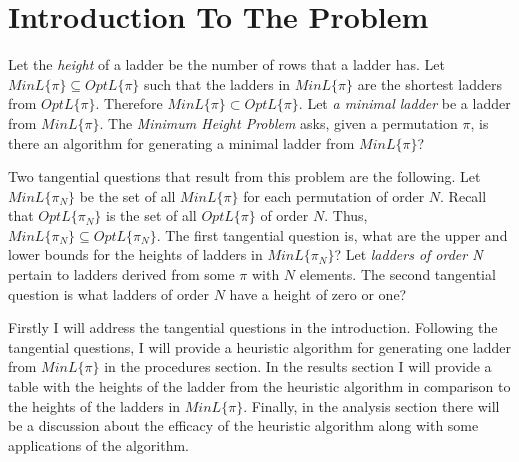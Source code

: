 \section{Introduction To The Problem}
Let the \emph{height} of a ladder be the number of rows that a ladder has. 
Let $MinL\{\pi\} \subseteq OptL\{\pi\}$ such that the ladders in $MinL\{\pi\}$ are the shortest ladders from 
$OptL\{\pi\}$. Therefore  $MinL\{\pi\}\subset OptL\{\pi\}$.  Let \emph{a minimal ladder} be a ladder from $MinL\{\pi\}$. The \emph{Minimum Height Problem} asks, 
given a permutation $\pi$, is there an algorithm for generating a minimal ladder
from $MinL\{\pi\}$?\par  
Two tangential questions that result from this problem are the following. Let $MinL\{\pi_{N}\}$ 
be the set of all $MinL\{\pi\}$ for each permutation of order $N$. Recall that $OptL\{\pi_{N}\}$ is the set of all 
$OptL\{\pi\}$ of order $N$. Thus, $MinL\{\pi_{N}\} \subseteq OptL\{\pi_{N}\}$.  The first tangential question is, 
what are the upper and lower bounds for the heights of ladders in $MinL\{\pi_{N}\}$? 
Let \emph{ladders of order N} pertain to ladders derived from some $\pi$ with $N$ elements.
The second tangential question is what ladders of order $N$ have a height of zero or one? \par 



Firstly I will address the tangential questions in the introduction. Following the tangential questions, 
I will provide a heuristic algorithm for generating one ladder from $MinL\{\pi\}$ in the procedures section. 
In the results section I will provide a table with the heights of the ladder from the heuristic algorithm in comparison to the heights of the ladders
in $MinL\{\pi\}$. Finally, in the analysis section there will be a discussion 
about the efficacy of the heuristic algorithm along with some applications of the algorithm.\par 


